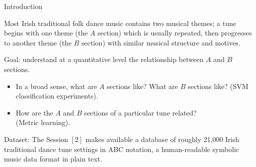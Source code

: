 \documentclass[letterpaper]{amsart}
\begin{document}
\begin{center}
\Huge
Introduction
\end{center}
\huge

Most Irish traditional folk dance music contains two musical themes; a tune begins with one theme (the $A$ section) which is usually repeated, then progresses to another theme (the $B$ section) with similar musical structure and motives.

Goal: understand at a quantitative level the relationship between $A$ and $B$ sections.
\begin{itemize}
\item In a broad sense, what are $A$ sections like? What are $B$ sections like? (SVM classification experiments).

\item How are the $A$ and $B$ sections of a particular tune related? \\(Metric learning).
\end{itemize}

Dataset: The Session $[2]$ makes available a database of roughly 21,000 Irish traditional dance tune settings in ABC notation, a human-readable symbolic music data format in plain text.
\end{document}
